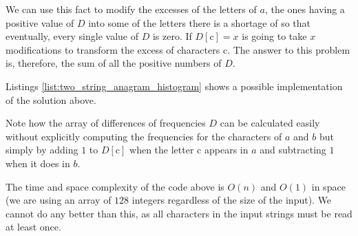 We can use this fact to modify the excesses of the letters of $a$, the ones having a positive value of $D$ into some of the letters there is a shortage of so that eventually, every single value of $D$ is zero.
If $D[\mathrm{c}] = x$ is going to take $x$ modifications to transform the excess of characters $\mathrm{c}$.
The answer to this problem is, therefore, the sum of all the positive numbers of $D$. 

Listings \ref{list:two_string_anagram_histogram} shows a possible implementation of the solution above.



Note how the array of differences of frequencies $D$ can be calculated easily without explicitly
computing the frequencies for the characters of $a$ and $b$ but simply by adding $1$ to $D[\mathrm{c}]$ when the letter $\mathrm{c}$ appears in $a$
and subtracting $1$ when it does in $b$. 

The time and space complexity of the code above is $O(n)$ and $O(1)$ in space (we are using an array of $128$ integers regardless of the size of the input). We cannot do any better than this, as all characters in the input strings must be read at least once.



